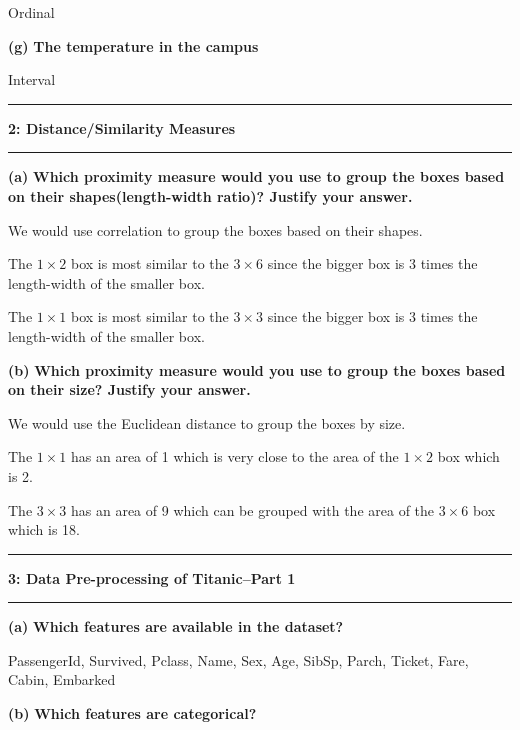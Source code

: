 \documentclass[11pt]{article}
\newcommand\question[2]{\vspace{.25in}\hrule\textbf{#1: #2}\vspace{.5em}\hrule\vspace{.10in}}
\renewcommand\part[1]{\vspace{.10in}\textbf{(#1)}}
\begin{document}
Ordinal

\part{g} \textbf{The temperature in the campus}

Interval




\question{2}{Distance/Similarity Measures} 
\part{a} \textbf{Which proximity measure would you use to group the boxes based on their shapes(length-width ratio)? Justify your answer.}


We would use correlation to group the boxes based on their shapes.

The $1 \times 2$ box is most similar to the $3 \times 6$ since the bigger box is 3 times the length-width of the smaller box.

The $1 \times 1$ box is most similar to the $3 \times 3$ since the bigger box is 3 times the length-width of the smaller box.


\part{b} \textbf{Which proximity measure would you use to group the boxes based on their size? Justify your answer.}

We would use the Euclidean distance to group the boxes by size.

The $1 \times 1$ has an area of 1 which is very close to the area of the $1 \times 2$ box which is 2.

The $3 \times 3$ has an area of 9 which can be grouped with the area of the $3 \times 6$ box which is 18.


\question{3}{Data Pre-processing of Titanic–Part 1} 

\part{a} \textbf{Which features are available in the dataset?}

PassengerId,   
Survived,         
Pclass,           
Name,           
Sex,             
Age,            
SibSp,         
Parch,          
Ticket,         
Fare,           
Cabin,           
Embarked        

\part{b} \textbf{Which features are categorical?}
\end{document}
